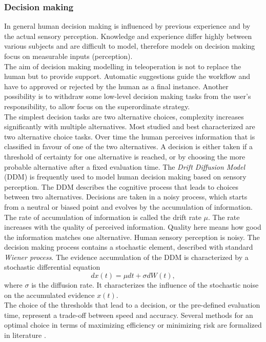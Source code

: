 \documentclass[a4paper,twoside, openright,12pt]{report}
\begin{document}
\subsubsection{Decision making}
In general human decision making is influenced by previous experience and by the actual sensory perception. Knowledge and experience differ highly between various subjects and are difficult to model, therefore models on decision making focus on measurable inputs (perception).\\
The aim of decision making modelling in teleoperation is not to replace the human but to provide support. Automatic suggestions guide the workflow and have to approved or rejected by the human as a final instance. Another possibility is to withdraw some low-level decision making tasks from the user's responsibility, to allow focus on the superordinate strategy.\\
The simplest decision tasks are two alternative choices, complexity increases significantly with multiple alternatives. Most studied and best characterized are two alternative choice tasks. Over time the human perceives information that is classified in favour of one of the two alternatives. A decision is either taken if a threshold of certainty for one alternative is reached, or by choosing the more probable alternative after a fixed evaluation time. The \emph{Drift Diffusion Model} (DDM) is frequently used to model human decision making based on sensory perception. The DDM describes the cognitive process that leads to choices between two alternatives. Decisions are taken in a noisy process, which starts from a neutral or biased point and evolves by the accumulation of information. The rate of accumulation of information is called the drift rate $\mu$. The rate increases with the quality of perceived information. Quality here means how good the information matches one alternative. Human sensory perception is noisy. The decision making process contains a stochastic element, described with standard \emph{Wiener process}.    The evidence accumulation of the DDM is characterized by a stochastic differential equation 
\begin{equation}
dx(t) = \mu dt + \sigma dW(t),
\end{equation}  
where $\sigma$ is the diffusion rate. It characterizes the influence of the stochastic noise on the accumulated evidence $x(t)$.\\
The choice of the thresholds that lead to a decision, or the pre-defined evaluation time, represent a trade-off between speed and accuracy. Several methods for an optimal choice in terms of maximizing efficiency or minimizing risk are formalized in literature \cite{Peters15}.
\end{document}
